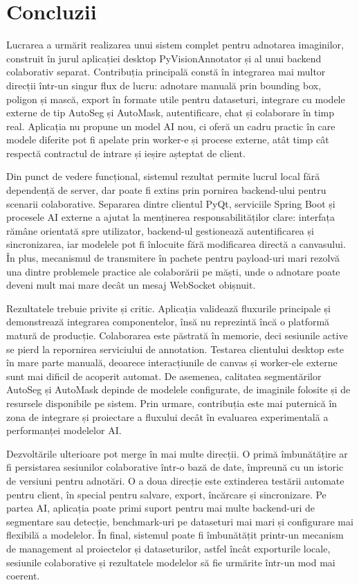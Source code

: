 \chapter{Concluzii}
\pagestyle{fancy}

Lucrarea a urmărit realizarea unui sistem complet pentru adnotarea imaginilor, construit în jurul aplicației desktop PyVisionAnnotator și al unui backend colaborativ separat. Contribuția principală constă în integrarea mai multor direcții într-un singur flux de lucru: adnotare manuală prin bounding box, poligon și mască, export în formate utile pentru dataseturi, integrare cu modele externe de tip AutoSeg și AutoMask, autentificare, chat și colaborare în timp real. Aplicația nu propune un model AI nou, ci oferă un cadru practic în care modele diferite pot fi apelate prin worker-e și procese externe, atât timp cât respectă contractul de intrare și ieșire așteptat de client.

Din punct de vedere funcțional, sistemul rezultat permite lucrul local fără dependență de server, dar poate fi extins prin pornirea backend-ului pentru scenarii colaborative. Separarea dintre clientul PyQt, serviciile Spring Boot și procesele AI externe a ajutat la menținerea responsabilităților clare: interfața rămâne orientată spre utilizator, backend-ul gestionează autentificarea și sincronizarea, iar modelele pot fi înlocuite fără modificarea directă a canvasului. În plus, mecanismul de transmitere în pachete pentru payload-uri mari rezolvă una dintre problemele practice ale colaborării pe măști, unde o adnotare poate deveni mult mai mare decât un mesaj WebSocket obișnuit.

Rezultatele trebuie privite și critic. Aplicația validează fluxurile principale și demonstrează integrarea componentelor, însă nu reprezintă încă o platformă matură de producție. Colaborarea este păstrată în memorie, deci sesiunile active se pierd la repornirea serviciului de annotation. Testarea clientului desktop este în mare parte manuală, deoarece interacțiunile de canvas și worker-ele externe sunt mai dificil de acoperit automat. De asemenea, calitatea segmentărilor AutoSeg și AutoMask depinde de modelele configurate, de imaginile folosite și de resursele disponibile pe sistem. Prin urmare, contribuția este mai puternică în zona de integrare și proiectare a fluxului decât în evaluarea experimentală a performanței modelelor AI.

Dezvoltările ulterioare pot merge în mai multe direcții. O primă îmbunătățire ar fi persistarea sesiunilor colaborative într-o bază de date, împreună cu un istoric de versiuni pentru adnotări. O a doua direcție este extinderea testării automate pentru client, în special pentru salvare, export, încărcare și sincronizare. Pe partea AI, aplicația poate primi suport pentru mai multe backend-uri de segmentare sau detecție, benchmark-uri pe dataseturi mai mari și configurare mai flexibilă a modelelor. În final, sistemul poate fi îmbunătățit printr-un mecanism de management al proiectelor și dataseturilor, astfel încât exporturile locale, sesiunile colaborative și rezultatele modelelor să fie urmărite într-un mod mai coerent.

